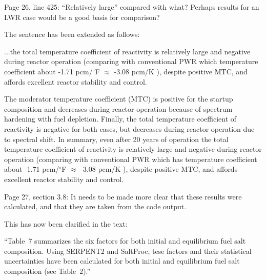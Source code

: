 \documentclass[answers,11pt]{exam}
\begin{document}
\begin{questions}
        \question  Page 26, line 425: ``Relatively large'' compared with what? 
        Perhaps results for an LWR case would be a good basis for comparison?
        \begin{solution}
                The sentence has been extended as follows:
                
                ...the total temperature coefficient of reactivity is 
                relatively large and negative during reactor operation 
                (comparing with conventional PWR which 							
                temperature coefficient about -1.71 pcm/$^\circ$F $\approx$ 
                -3.08 pcm/K 							
                \cite{forget_integral_2018}), despite positive MTC, and affords 
                excellent reactor stability and control.

                The moderator
temperature coefficient (MTC) is positive for the startup composition and decreases
during reactor operation because of spectrum hardening with fuel depletion.
Finally, the total temperature coefficient of reactivity is negative for both
cases, but decreases during reactor operation due to spectral shift. In
summary, even after 20 years of operation the total temperature coefficient of
reactivity is relatively large and negative during reactor operation (comparing
with conventional PWR which has temperature coefficient about -1.71 pcm/$^\circ$F
$\approx$ -3.08 pcm/K \cite{forget_integral_2018}), despite positive MTC, and
affords excellent reactor stability and control.


        \end{solution}

        \question  Page 27, section 3.8: It needs to be made more clear that 
        these results were calculated, and that they are taken from the code 
        output.
        \begin{solution}
                This has now been clarified in the text:
                
                ``Table~7 summarizes the six factors for both initial and 
                equilibrium fuel salt composition. Using SERPENT2 and SaltProc, 
                tese factors and their statistical uncertainties have been 
                calculated for both initial and equilibrium fuel salt 
                composition (see Table~2).''
        \end{solution}


\end{questions}
\end{document}
